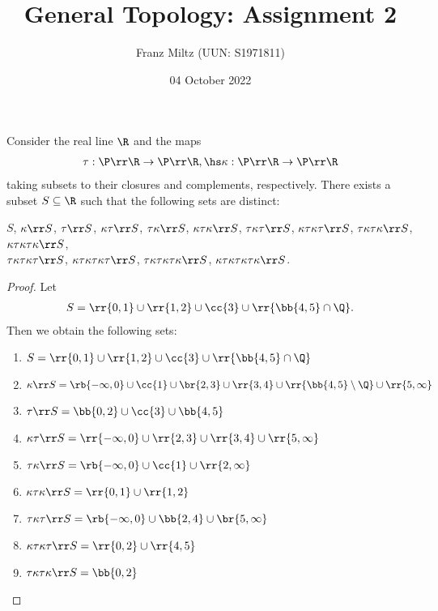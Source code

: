 \documentclass{article}
\begin{document}
\title{General Topology: Assignment 2}
\author{Franz Miltz (UUN: S1971811)}
\date{04 October 2022}
\maketitle

\begin{claim*}[1]
	Consider the real line $\R$ and the maps
	\begin{align*}
		\tau : \P\rr\R \to \P\rr\R, \hs
		\kappa : \P\rr\R \to \P\rr\R
	\end{align*}
	taking subsets to their closures and complements, respectively.
	There exists a subset $S\subseteq\R$ such that the following sets are distinct:
	\begin{center}
		$S$,
		$\kappa\rr S$,
		$\tau\rr S$,
		$\kappa\tau\rr S$,
		$\tau\kappa\rr S$,
		$\kappa\tau\kappa\rr S$,
		$\tau\kappa\tau\rr S$,
		$\kappa\tau\kappa\tau\rr S$,
		$\tau\kappa\tau\kappa\rr S$,
		$\kappa\tau\kappa\tau\kappa\rr S$,\\
		$\tau\kappa\tau\kappa\tau\rr S$,
		$\kappa\tau\kappa\tau\kappa\tau\rr S$,
		$\tau\kappa\tau\kappa\tau\kappa\rr S$,
		$\kappa\tau\kappa\tau\kappa\tau\kappa\rr S$.
	\end{center}
	\begin{proof}
		Let \begin{align*}
			S = \rr{0,1} \cup \rr{1,2} \cup \cc{3} \cup \rr{\bb{4,5}\cap\Q}.
		\end{align*}
		Then we obtain the following sets:
		\begin{enumerate}
			\item $S=\rr{0,1} \cup \rr{1,2} \cup \cc{3} \cup \rr{\bb{4,5}\cap\Q}$
			\item $\kappa\rr S=\rb{-\infty,0}\cup\cc{1}\cup\br{2,3}\cup\rr{3,4}\cup\rr{\bb{4,5}\setminus\Q}\cup\rr{5,\infty}$
			\item $\tau\rr S=\bb{0,2}\cup\cc{3}\cup\bb{4,5}$
			\item $\kappa\tau\rr S=\rr{-\infty,0}\cup\rr{2,3}\cup\rr{3,4}\cup\rr{5,\infty}$
			\item $\tau\kappa\rr S=\rb{-\infty,0}\cup\cc{1}\cup\rr{2,\infty}$
			\item $\kappa\tau\kappa\rr S=\rr{0,1}\cup\rr{1,2}$
			\item $\tau\kappa\tau\rr S=\rb{-\infty,0}\cup\bb{2,4}\cup\br{5,\infty}$
			\item $\kappa\tau\kappa\tau\rr S=\rr{0,2}\cup\rr{4,5}$
			\item $\tau\kappa\tau\kappa\rr S=\bb{0,2}$

\end{enumerate}
\end{proof}
\end{claim*}
\end{document}
